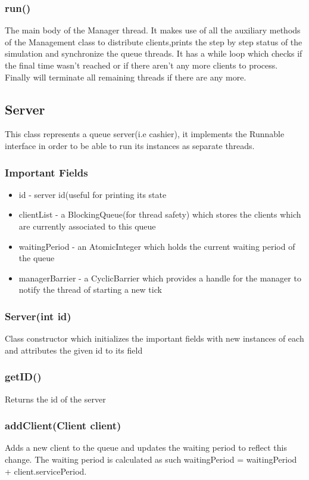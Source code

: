 \documentclass[10pt,a4paper]{article}
\begin{document}
\subsubsection{run()}
The main body of the Manager thread. It makes use of all the auxiliary methods of the Management class to distribute clients,prints the step by step status of the simulation and synchronize the queue threads. It has a while loop which checks if the final time wasn't reached or if there aren't any more clients to process. Finally will terminate all remaining threads if there are any more.
\subsection{Server}
This class represents a queue server(i.e cashier), it implements the Runnable interface in order to be able to run its instances as separate threads.
\subsubsection{Important Fields}
\begin{itemize}
\item id - server id(useful for printing its state
\item clientList - a BlockingQueue(for thread safety) which stores the clients which are currently associated to this queue
\item waitingPeriod - an AtomicInteger which holds the current waiting period of the queue
\item managerBarrier - a CyclicBarrier which provides a handle for the manager to notify the thread of starting a new tick
\end{itemize}
\subsubsection{Server(int id)}
Class constructor which initializes the important fields with new instances of each and attributes the given id to its field
\subsubsection{getID()}
Returns the id of the server
\subsubsection{addClient(Client client)}
Adds a new client to the queue and updates the waiting period to reflect this change. The waiting period is calculated as such
waitingPeriod = waitingPeriod + client.servicePeriod.
\end{document}
